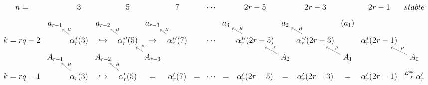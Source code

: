 \documentclass{article}
\begin{document}
\(
\begin{tikzcd}[nodes={font=\Large},row sep=0.3cm,column sep=0.1cm]
n= & & 3 & & 5 & & 7 & & \cdots & & 2r-5 & & 2r-3 &  & 2r-1 & stable \\
 & a_{r-1} & & a_{r-2} & & a_{r-3} & & & & a_3& & a_2 & & (a_1) \\
k=rq-2 & & \alpha_r^*(3) \arrow[lu,"H"'] & \hookrightarrow & \alpha_r^{*\prime}(5) \arrow[lu,"H"'] & \rightarrow & \alpha_r^{*\prime}(7) \arrow[lu,"H"'] & & \cdots & & \alpha_r^{*\prime}(2r-5) \arrow[lu,"H"'] & & \alpha_r^{*\prime}(2r-3) \arrow[lu,"H"'] & & \alpha_r^{*}(2r-1) & & \\
& A_{r-1} & & A_{r-2} & & A_{r-3} \arrow[lu,"P"'] & & & & & & A_{2} \arrow[lu,"P"'] & & A_{1} \arrow[lu,"P"'] & & A_{0} \arrow[lu,"P"']\\
k=rq-1 & & \alpha_r(3) \arrow[lu,"H"'] & \hookrightarrow & \alpha_r^{\prime}(5) \arrow[lu,"H"'] & = & \alpha_r^{\prime}(7) & = & \cdots & = & \alpha_r^{\prime}(2r-5) & = & \alpha_r^{\prime}(2r-3) & = & \alpha_r^{\prime}(2r-1) & \stackrel{E^\infty}{\rightarrow} \alpha_r^{\prime} 
\end{tikzcd}
\)
\end{document}
